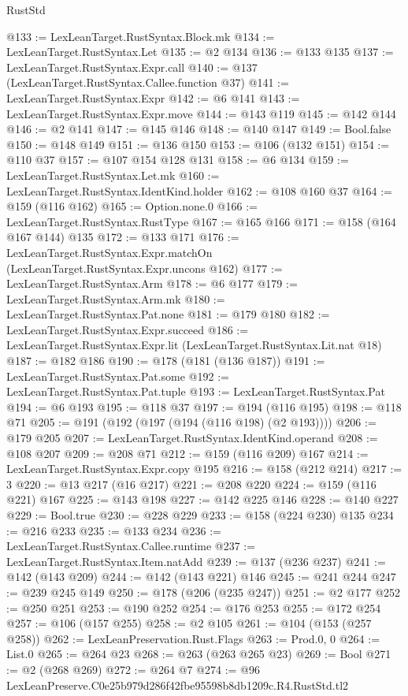 \begin{lexlean}{RustStd}
\begin{coremodule}
@133 := LexLeanTarget.RustSyntax.Block.mk
@134 := LexLeanTarget.RustSyntax.Let
@135 := @2 @134
@136 := @133 @135
@137 := LexLeanTarget.RustSyntax.Expr.call
@140 := @137 (LexLeanTarget.RustSyntax.Callee.function @37)
@141 := LexLeanTarget.RustSyntax.Expr
@142 := @6 @141
@143 := LexLeanTarget.RustSyntax.Expr.move
@144 := @143 @119
@145 := @142 @144
@146 := @2 @141
@147 := @145 @146
@148 := @140 @147
@149 := Bool.false
@150 := @148 @149
@151 := @136 @150
@153 := @106 (@132 @151)
@154 := @110 @37
@157 := @107 @154 @128 @131
@158 := @6 @134
@159 := LexLeanTarget.RustSyntax.Let.mk
@160 := LexLeanTarget.RustSyntax.IdentKind.holder
@162 := @108 @160 @37
@164 := @159 (@116 @162)
@165 := Option.none.{0}
@166 := LexLeanTarget.RustSyntax.RustType
@167 := @165 @166
@171 := @158 (@164 @167 @144) @135
@172 := @133 @171
@176 := LexLeanTarget.RustSyntax.Expr.matchOn (LexLeanTarget.RustSyntax.Expr.uncons @162)
@177 := LexLeanTarget.RustSyntax.Arm
@178 := @6 @177
@179 := LexLeanTarget.RustSyntax.Arm.mk
@180 := LexLeanTarget.RustSyntax.Pat.none
@181 := @179 @180
@182 := LexLeanTarget.RustSyntax.Expr.succeed
@186 := LexLeanTarget.RustSyntax.Expr.lit (LexLeanTarget.RustSyntax.Lit.nat @18)
@187 := @182 @186
@190 := @178 (@181 (@136 @187))
@191 := LexLeanTarget.RustSyntax.Pat.some
@192 := LexLeanTarget.RustSyntax.Pat.tuple
@193 := LexLeanTarget.RustSyntax.Pat
@194 := @6 @193
@195 := @118 @37
@197 := @194 (@116 @195)
@198 := @118 @71
@205 := @191 (@192 (@197 (@194 (@116 @198) (@2 @193))))
@206 := @179 @205
@207 := LexLeanTarget.RustSyntax.IdentKind.operand
@208 := @108 @207
@209 := @208 @71
@212 := @159 (@116 @209) @167
@214 := LexLeanTarget.RustSyntax.Expr.copy @195
@216 := @158 (@212 @214)
@217 := 3
@220 := @13 @217 (@16 @217)
@221 := @208 @220
@224 := @159 (@116 @221) @167
@225 := @143 @198
@227 := @142 @225 @146
@228 := @140 @227
@229 := Bool.true
@230 := @228 @229
@233 := @158 (@224 @230) @135
@234 := @216 @233
@235 := @133 @234
@236 := LexLeanTarget.RustSyntax.Callee.runtime
@237 := LexLeanTarget.RustSyntax.Item.natAdd
@239 := @137 (@236 @237)
@241 := @142 (@143 @209)
@244 := @142 (@143 @221) @146
@245 := @241 @244
@247 := @239 @245 @149
@250 := @178 (@206 (@235 @247))
@251 := @2 @177
@252 := @250 @251
@253 := @190 @252
@254 := @176 @253
@255 := @172 @254
@257 := @106 (@157 @255)
@258 := @2 @105
@261 := @104 (@153 (@257 @258))
@262 := LexLeanPreservation.Rust.Flags
@263 := Prod.{0, 0}
@264 := List.{0}
@265 := @264 @23
@268 := @263 (@263 @265 @23)
@269 := Bool
@271 := @2 (@268 @269)
@272 := @264 @7
@274 := @96 LexLeanPreserve.C0e25b979d286f42fbe95598b8db1209c.R4.RustStd.tl2

\end{coremodule}
\end{lexlean}
